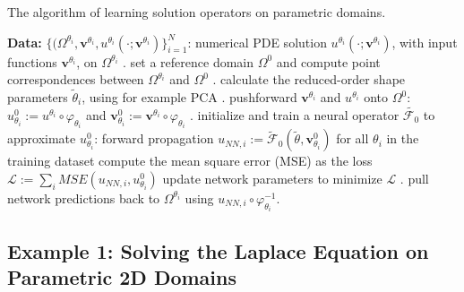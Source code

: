 \documentclass[review]{elsarticle}
\def\Omegathetai{{\Omega^{\theta_i}}}
\def\refd{0}
\def\Omegaref{{\Omega^\refd}}
\def\F0{{\mathcal{F}_{\refd}}}
\begin{document}
\begin{algorithm}[H]
\caption{The algorithm of learning solution operators on parametric domains.}\label{alg:1}
    \begin{algorithmic}
 \Statex \textbf{Data:} $\{(\Omegathetai,\mathbf{v}^{\theta_i},u^{\theta_i}(\cdot;\mathbf{v}^{\theta_i})\}_{i=1}^N$: numerical PDE solution $u^{\theta_i}(\cdot;\mathbf{v}^{\theta_i})$, with input functions $\mathbf{v}^{\theta_i}$, on $\Omegathetai$
 . set a reference domain $\Omegaref$ and compute point correspondences between $\Omegathetai$ and $\Omegaref$\;
 . calculate the reduced-order shape parameters $\tilde{\theta}_i$, using for example PCA\;
 . pushforward $\mathbf{v}^{\theta_i}$ and $u^{\theta_i}$ onto $\Omegaref$: $u^0_{\theta_i}:=u^{\theta_i}\circ\varphi_{\theta_i}$ and $\mathbf{v}^{0}_{\theta_i} := \mathbf{v}^{\theta_i} \circ \varphi_{\theta_i}$\;
 . initialize and train a neural operator $\tilde{\F0}$ to approximate $u^0_{\theta_i}$: 
    \State forward propagation $u_{NN,i} :=  \tilde{\mathcal{F}}_{0}(\tilde{\theta},\mathbf{v}^{0}_{\theta_i})$ for all $\theta_i$ in the training dataset \; 
    \State compute the mean square error (MSE) as the loss $\mathcal{L} := \sum_i MSE(u_{NN,i}, u^{0}_{\theta_i})$ \;
    \State update network parameters to minimize $\mathcal{L}$\;
 \EndFor
 . pull network predictions back to $\Omegathetai$ using $ u_{NN,i}\circ \varphi_{\theta_i}^{-1}$.
 \end{algorithmic}
\end{algorithm}

\subsection{Example 1: Solving the Laplace Equation on Parametric 2D Domains}
\label{subsec:lap}
\end{document}
